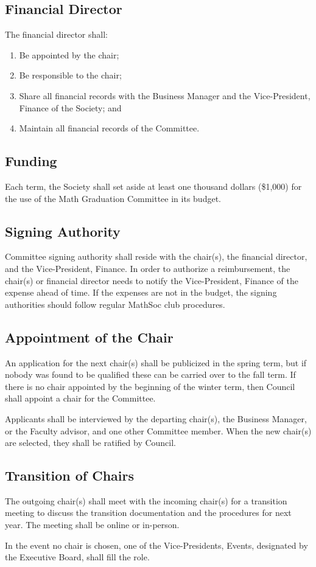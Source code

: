 \subsection{Financial Director}
The financial director shall:
\begin{enumerate}
\item Be appointed by the chair;
\item Be responsible to the chair;
\item Share all financial records with the Business Manager and the Vice-President, Finance of the Society; and
\item Maintain all financial records of the Committee.
\end{enumerate}

\subsection{Funding}
Each term, the Society shall set aside at least one thousand dollars (\$1,000) for the use of the Math Graduation Committee in its budget.

\subsection{Signing Authority}
Committee signing authority shall reside with the chair(s), the financial director, 
and the Vice-President, Finance. In order to authorize a reimbursement, the chair(s) 
or financial director needs to notify the Vice-President, Finance of the expense 
ahead of time. If the expenses are not in the budget, the signing authorities should 
follow regular MathSoc club procedures. 

\subsection{Appointment of the Chair}
An application for the next chair(s) shall be publicized in the spring term, but if 
nobody was found to be qualified these can be carried over to the fall term. If there 
is no chair appointed by the beginning of the winter term, then Council shall appoint 
a chair for the Committee.

Applicants shall be interviewed by the departing chair(s), the Business Manager, 
or the Faculty advisor, and one other Committee member.
When the new chair(s) are selected, they shall be ratified by Council.

\subsection{Transition of Chairs}
The outgoing chair(s) shall meet with the incoming chair(s) for a transition 
meeting to discuss the transition documentation and the procedures for next year. The 
meeting shall be online or in-person.

In the event no chair is chosen, one of the Vice-Presidents, Events, designated by the Executive Board, shall fill the role.
